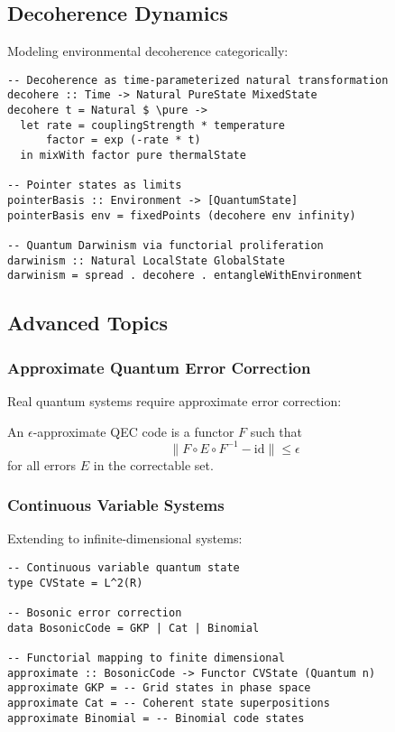 \subsection{Decoherence Dynamics}

Modeling environmental decoherence categorically:

\begin{example}
\begin{verbatim}
-- Decoherence as time-parameterized natural transformation
decohere :: Time -> Natural PureState MixedState
decohere t = Natural $ \pure ->
  let rate = couplingStrength * temperature
      factor = exp (-rate * t)
  in mixWith factor pure thermalState

-- Pointer states as limits
pointerBasis :: Environment -> [QuantumState]
pointerBasis env = fixedPoints (decohere env infinity)

-- Quantum Darwinism via functorial proliferation
darwinism :: Natural LocalState GlobalState
darwinism = spread . decohere . entangleWithEnvironment
\end{verbatim}
\end{example}

\subsection{Advanced Topics}

\subsubsection{Approximate Quantum Error Correction}

Real quantum systems require approximate error correction:

\begin{definition}
An $\epsilon$-approximate QEC code is a functor $F$ such that
\[
\|F \circ E \circ F^{-1} - \text{id}\| \leq \epsilon
\]
for all errors $E$ in the correctable set.
\end{definition}

\subsubsection{Continuous Variable Systems}

Extending to infinite-dimensional systems:

\begin{example}
\begin{verbatim}
-- Continuous variable quantum state
type CVState = L^2(R)

-- Bosonic error correction
data BosonicCode = GKP | Cat | Binomial

-- Functorial mapping to finite dimensional
approximate :: BosonicCode -> Functor CVState (Quantum n)
approximate GKP = -- Grid states in phase space
approximate Cat = -- Coherent state superpositions
approximate Binomial = -- Binomial code states
\end{verbatim}
\end{example}

